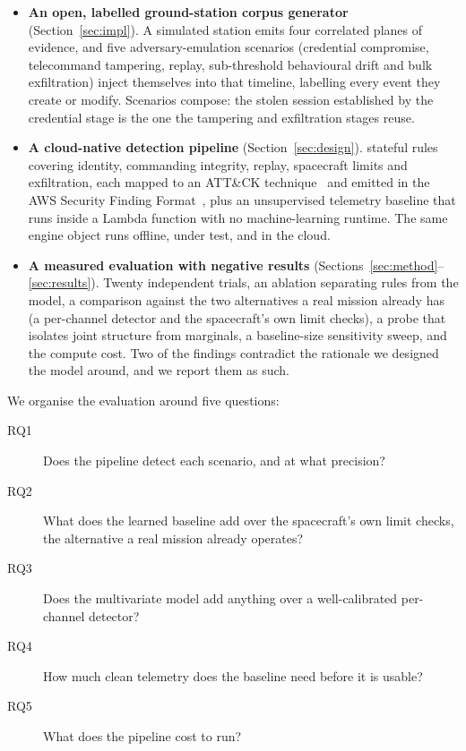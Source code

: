 \documentclass[conference]{IEEEtran}
\begin{document}
\begin{itemize}
  \item \textbf{An open, labelled ground-station corpus generator}
  (Section~\ref{sec:impl}). A simulated station emits four correlated planes of
  evidence, and five adversary-emulation scenarios (credential compromise,
  telecommand tampering, replay, sub-threshold behavioural drift and bulk
  exfiltration) inject themselves into that timeline, labelling every event
  they create or modify. Scenarios compose: the stolen session established by
  the credential stage is the one the tampering and exfiltration stages reuse.

  \item \textbf{A cloud-native detection pipeline}
  (Section~\ref{sec:design}). \expRuleCount{} stateful rules covering identity,
  commanding integrity, replay, spacecraft limits and exfiltration, each mapped
  to an ATT\&CK technique~\cite{attack} and emitted in the AWS Security Finding
  Format~\cite{asff}, plus an unsupervised telemetry baseline that runs inside a
  Lambda function with no machine-learning runtime. The same engine object runs
  offline, under test, and in the cloud.

  \item \textbf{A measured evaluation with negative results}
  (Sections~\ref{sec:method}--\ref{sec:results}). Twenty independent trials,
  an ablation separating rules from the model, a comparison against the two
  alternatives a real mission already has (a per-channel detector and the
  spacecraft's own limit checks), a probe that isolates joint structure from
  marginals, a baseline-size sensitivity sweep, and the compute cost. Two of the
  findings contradict the rationale we designed the model around, and we report
  them as such.
\end{itemize}

We organise the evaluation around five questions:

\begin{description}
  \item[RQ1] Does the pipeline detect each scenario, and at what precision?
  \item[RQ2] What does the learned baseline add over the spacecraft's own limit
  checks, the alternative a real mission already operates?
  \item[RQ3] Does the multivariate model add anything over a well-calibrated
  per-channel detector?
  \item[RQ4] How much clean telemetry does the baseline need before it is
  usable?
  \item[RQ5] What does the pipeline cost to run?
\end{description}
\end{document}

